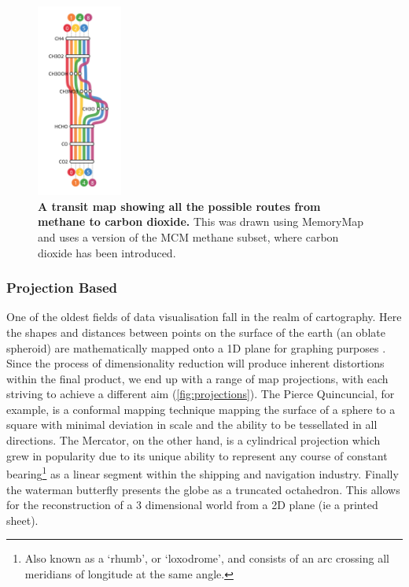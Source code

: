\begin{figure}[H]
     \centering
     \includegraphics[width=0.25\textwidth, angle=0]{figures_c1/layout/memory.png}
         \caption{\textbf{A transit map showing all the possible routes from methane to carbon dioxide.} This was drawn using MemoryMap \citep{memory} and uses a version of the MCM methane subset, where carbon dioxide has been introduced.}
        \label{fig:mem}
\end{figure}





\subsubsection{Projection Based}\label{sec:merc}
One of the oldest fields of data visualisation fall in the realm of cartography. Here the shapes and distances between points on the surface of the earth (an oblate spheroid) are mathematically mapped onto a 1D plane for graphing purposes \citep{projections}. Since the process of dimensionality reduction will produce inherent distortions within the final product, we end up with a range of map projections, with each striving to achieve a different aim (\autoref{fig:projections}). The Pierce Quincuncial, for example, is a conformal mapping technique mapping the surface of a sphere to a square with minimal deviation in scale and the ability to be tessellated in all directions. The Mercator, on the other hand, is a cylindrical projection which grew in popularity due to its unique ability to represent any course of constant bearing\footnote{Also known as a `rhumb', or `loxodrome', and consists of an arc crossing all meridians of longitude at the same angle.} as a linear segment within the shipping and navigation industry.  Finally the waterman butterfly presents the globe as a truncated octahedron. This allows for the reconstruction of a 3 dimensional world from a 2D plane (ie a printed sheet). 


